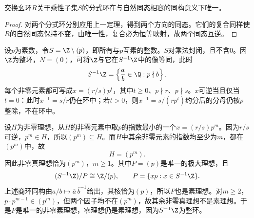\begin{corollary}
交换幺环$R$关于乘性子集$S$的分式环在与自然同态相容的同构意义下唯一。
\end{corollary}
\begin{proof}
对两个分式环分别应用上一定理，得到两个方向的同态。它们的复合同样使$R$的自然同态保持不变，由唯一性，复合必为恒等映射，故两个同态互逆。
\end{proof}

\begin{example}
设$p$为素数，令$S=\Z\setminus(p)$，即所有与$p$互素的整数。$S$对乘法封闭，且不含$0$。因$\Z$为整环，$N=(0)$，可将$\Z$与它在$S^{-1}\Z$中的像等同，此时
\[
S^{-1}\Z=\left\{\frac ab\in\Q:p\nmid b\right\}.
\]
每个非零元素都可写成$x=(r/s)p^t$，其中$t\ge0$、$p\nmid r$、$p\nmid s$。$x$可逆当且仅当$t=0$：此时$x^{-1}=s/r$仍在环中；若$t>0$，则$x^{-1}=s/(rp^t)$约分后的分母仍被$p$整除，不在环中。

设$H$为非零理想，从$H$的非零元素中取$p$的指数最小的一个$x=(r/s)p^m$。因为$r/s$可逆，$p^m\in H$，所以$(p^m)\subseteq H$。而$H$中其余非零元素的指数均至少为$m$，都在$(p^m)$中，故
\[
H=(p^m).
\]
因此非零真理想恰为$(p^m)$，$m\ge1$。其中$P=(p)$是唯一的极大理想，且
\[
(S^{-1}\Z)/P\cong\Z/(p),\qquad
P=\{xp:x\in S^{-1}\Z\}.
\]
上述商环同构由$a/b\mapsto\overline a\,\overline b^{-1}$给出，其核恰为$(p)$，所以$P$也是素理想。对$m\ge2$，$p\cdot p^{m-1}\in(p^m)$，但两个因子均不在$(p^m)$，故其余非零真理想不是素理想。于是$P$是唯一的非零素理想，零理想仍是素理想，因为$S^{-1}\Z$为整环。
\end{example}
